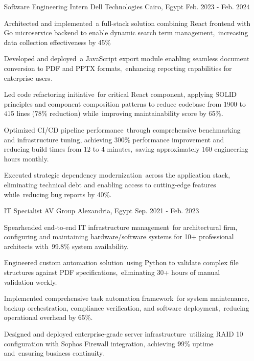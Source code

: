 \begin{cventries}

  \cventry
   {Software Engineering Intern} %
    {Dell Technologies} %
    {Cairo, Egypt} %
    {Feb. 2023 - Feb. 2024} %
    {
      \begin{cvitems} %
        \item {Architected and implemented a full-stack solution combining React frontend with Go microservice backend to enable dynamic search term management, increasing data collection effectiveness by 45\%}
        \item {Developed and deployed a JavaScript export module enabling seamless document conversion to PDF and PPTX formats, enhancing reporting capabilities for enterprise users.}
        \item {Led code refactoring initiative for critical React component, applying SOLID principles and component composition patterns to reduce codebase from 1900 to 415 lines (78\% reduction) while improving maintainability score by 65\%.}
        \item{Optimized CI/CD pipeline performance through comprehensive benchmarking and infrastructure tuning, achieving 300\% performance improvement and reducing build times from 12 to 4 minutes, saving approximately 160 engineering hours monthly.}
        \item{Executed strategic dependency modernization across the application stack, eliminating technical debt and enabling access to cutting-edge features while reducing bug reports by 40\%.}
      \end{cvitems}
    }
    
     \cventry
    {IT Specialist} %
    {AV Group} %
    {Alexandria, Egypt} %
    {Sep. 2021 - Feb. 2023} %
    {
      \begin{cvitems} %
      \item{Spearheaded end-to-end IT infrastructure management for architectural firm, configuring and maintaining hardware/software systems for 10+ professional architects with 99.8\% system availability.}
        \item {Engineered custom automation solution using Python to validate complex file structures against PDF specifications, eliminating 30+ hours of manual validation weekly.}
        \item {Implemented comprehensive task automation framework for system maintenance, backup orchestration, compliance verification, and software deployment, reducing operational overhead by 65\%.}
        \item {Designed and deployed enterprise-grade server infrastructure utilizing RAID 10 configuration with Sophos Firewall integration, achieving 99\% uptime and ensuring business continuity.}
      \end{cvitems}
    }
    

\end{cventries}
